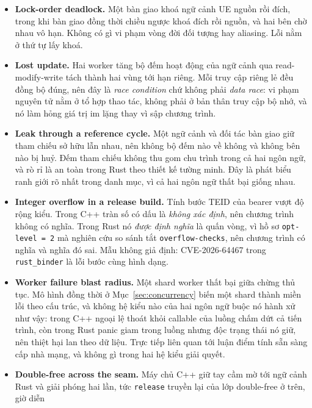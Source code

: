 \begin{itemize}
  \item \textbf{Lock-order deadlock.} Một bàn giao khoá ngữ cảnh UE nguồn rồi đích, trong khi
        bàn giao đồng thời chiều ngược khoá đích rồi nguồn, và hai bên chờ nhau vô hạn. Không có
        gì vi phạm vòng đời đối tượng hay aliasing. Lỗi nằm ở thứ tự lấy khoá.
  \item \textbf{Lost update.} Hai worker tăng bộ đếm hoạt động của ngữ cảnh qua read-modify-write
        tách thành hai vùng tới hạn riêng. Mỗi truy cập riêng lẻ đều đồng bộ đúng, nên đây là
        \emph{race condition} chứ không phải \emph{data race}: vi phạm nguyên tử nằm ở tổ hợp
        thao tác, không phải ở bản thân truy cập bộ nhớ, và nó làm hỏng giá trị im lặng thay vì
        sập chương trình.
  \item \textbf{Leak through a reference cycle.} Một ngữ cảnh và đối tác bàn giao giữ tham chiếu
        sở hữu lẫn nhau, nên không bộ đếm nào về không và không bên nào bị huỷ. Đếm tham chiếu
        không thu gom chu trình trong cả hai ngôn ngữ, và rò rỉ là an toàn trong Rust theo thiết
        kế tường minh. Đây là phát biểu ranh giới rõ nhất trong danh mục, vì cả hai ngôn ngữ
        thất bại giống nhau.
  \item \textbf{Integer overflow in a release build.} Tính bước TEID của bearer vượt độ rộng
        kiểu. Trong C++ tràn số có dấu là \emph{không xác định}, nên chương trình không có
        nghĩa. Trong Rust nó \emph{được định nghĩa} là quấn vòng, vì hồ sơ \texttt{opt-level~=~2}
        mà nghiên cứu so sánh tắt \texttt{overflow-checks}, nên chương trình có nghĩa và nghĩa
        đó sai. Mẫu không giả định: CVE-2026-64467 trong \texttt{rust\_binder} là lỗi bước cùng
        hình dạng.
  \item \textbf{Worker failure blast radius.} Một shard worker thất bại giữa chừng thủ tục. Mô hình
        đồng thời ở Mục~\ref{sec:concurrency} biến một shard thành miền lỗi theo cấu trúc, và
        không hệ kiểu nào của hai ngôn ngữ buộc nó hành xử như vậy: trong C++ ngoại lệ thoát khỏi
        callable của luồng chấm dứt cả tiến trình, còn trong Rust panic giam trong luồng nhưng
        độc trạng thái nó giữ, nên thiệt hại lan theo dữ liệu. Trực tiếp liên quan tới luận điểm
        tính sẵn sàng cấp nhà mạng, và không gì trong hai hệ kiểu giải quyết.
  \item \textbf{Double-free across the seam.} Máy chủ C++ giữ tay cầm mờ tới ngữ cảnh Rust và
        giải phóng hai lần, tức \texttt{release} truyền lại của lớp double-free ở trên, giờ diễn

\end{itemize}
